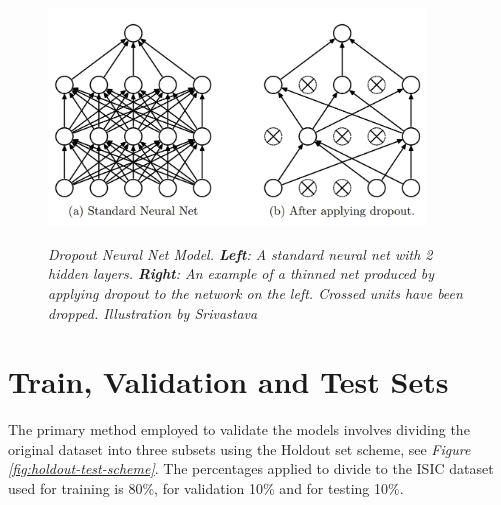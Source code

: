\begin{figure}[H]
  \centering
  \includegraphics[width=10cm]{imatges/preliminaries/dropout.png}
  \caption[Dropout]{\textit{Dropout Neural Net Model. \textbf{Left}: A standard neural net with 2 hidden layers. \textbf{Right}:
  An example of a thinned net produced by applying dropout to the network on the left.
  Crossed units have been dropped. Illustration by Srivastava}}
  {\label{fig:dropout}}
\end{figure}

\section{Train, Validation and Test Sets}

The primary method employed to validate the models involves dividing the
original dataset into three subsets using the Holdout set scheme, see
\textit{Figure \ref{fig:holdout-test-scheme}}. The percentages applied to
divide to the ISIC dataset used for training is 80\%, for validation 10\% and
for testing 10\%. \newline

